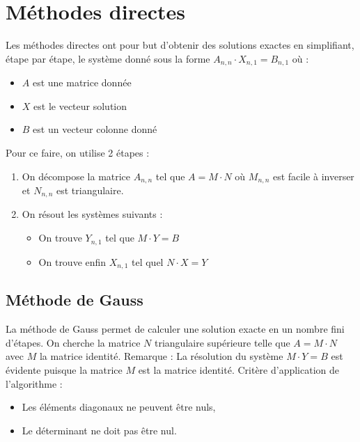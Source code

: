 \documentclass{report}
\begin{document}
  \chapter{Méthodes directes}
    Les méthodes directes ont pour but d'obtenir des solutions exactes en simplifiant, étape par étape, le système donné sous la forme 
    $A_{n,n} \cdot X_{n,1} = B_{n,1}$ où :
    \begin{itemize}
     \item{$A$ est une matrice donnée}
     \item{$X$ est le vecteur solution}
     \item{$B$ est un vecteur colonne donné}
    \end{itemize}
    Pour ce faire, on utilise 2 étapes :
    \begin{enumerate}
     \item{On décompose la matrice $A_{n,n}$ tel que $A = M \cdot N$ où $M_{n,n}$ est facile à inverser et $N_{n,n}$ est triangulaire.}
     \item{On résout les systèmes suivants : 
           \begin{itemize}
            \item{On trouve $Y_{n,1}$ tel que $M \cdot Y = B$}
            \item{On trouve enfin $X_{n,1} $ tel quel $N \cdot X = Y$}
           \end{itemize}
           }
    \end{enumerate}
    \section{Méthode de Gauss}
      La méthode de Gauss permet de calculer une solution exacte en un nombre fini d'étapes.
      \newline
      On cherche la matrice $N$ triangulaire supérieure telle que $A = M \cdot N$ avec $M$ la matrice identité.
      \newline
      Remarque : La résolution du système $M \cdot Y = B$ est évidente puisque la matrice $M$ est la matrice identité.
      \newline
      Critère d'application de l'algorithme :
      \begin{itemize}
        \item{Les éléments diagonaux ne peuvent être nuls,}
        \item{Le déterminant ne doit pas être nul.}
      \end{itemize}
        \lstset{language=C,showstringspaces=false}
\end{document}
